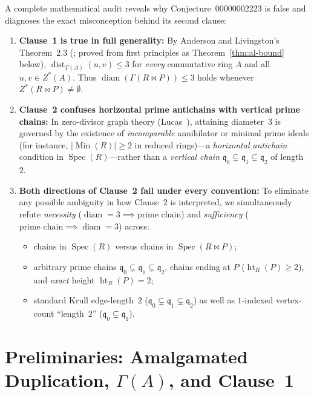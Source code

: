 \documentclass[11pt]{article}
\theoremstyle{definition}
\newcommand{\Spec}{\operatorname{Spec}}
\newcommand{\diam}{\operatorname{diam}}
\newcommand{\dist}{\operatorname{dist}}
\newcommand{\htop}{\operatorname{ht}}
\begin{document}
A complete mathematical audit reveals why Conjecture~00000002223 is false and diagnoses
the exact misconception behind its second clause:
\begin{enumerate}
  \item \textbf{Clause~1 is true in full generality:} By Anderson and Livingston's Theorem~2.3
  (\cite{AndersonLivingston1999}; proved from first principles as Theorem~\ref{thm:al-bound}
  below), $\dist_{\Gamma(A)}(u, v) \le 3$ for \emph{every} commutative ring $A$ and all
  $u, v \in Z^*(A)$. Thus $\diam(\Gamma(R \bowtie P)) \le 3$ holds whenever
  $Z^*(R \bowtie P) \neq \emptyset$.
  \item \textbf{Clause~2 confuses horizontal prime antichains with vertical prime chains:}
  In zero-divisor graph theory (Lucas~\cite{Lucas2006}), attaining diameter~$3$ is
  governed by the existence of \emph{incomparable} annihilator or minimal prime ideals
  (for instance, $|\operatorname{Min}(R)| \ge 2$ in reduced rings)---a \emph{horizontal
  antichain} condition in $\Spec(R)$---rather than a \emph{vertical chain}
  $\mathfrak{q}_0 \subsetneq \mathfrak{q}_1 \subsetneq \mathfrak{q}_2$ of length~$2$.
  \item \textbf{Both directions of Clause~2 fail under every convention:}
  To eliminate any possible ambiguity in how Clause~2 is interpreted, we simultaneously
  refute \emph{necessity} ($\diam = 3 \implies \text{prime chain}$) and \emph{sufficiency}
  ($\text{prime chain} \implies \diam = 3$) across:
  \begin{itemize}
    \item chains in $\Spec(R)$ versus chains in $\Spec(R \bowtie P)$;
    \item arbitrary prime chains $\mathfrak{q}_0 \subsetneq \mathfrak{q}_1 \subsetneq \mathfrak{q}_2$,
    chains ending at $P$ ($\htop_R(P) \ge 2$), and \emph{exact} height $\htop_R(P) = 2$;
    \item standard Krull edge-length~$2$ ($\mathfrak{q}_0 \subsetneq \mathfrak{q}_1 \subsetneq \mathfrak{q}_2$)
    as well as $1$-indexed vertex-count ``length~$2$'' ($\mathfrak{q}_0 \subsetneq \mathfrak{q}_1$).
  \end{itemize}
\end{enumerate}

\section{Preliminaries: Amalgamated Duplication, \texorpdfstring{$\Gamma(A)$}{Gamma(A)}, and Clause~1}
\end{document}
